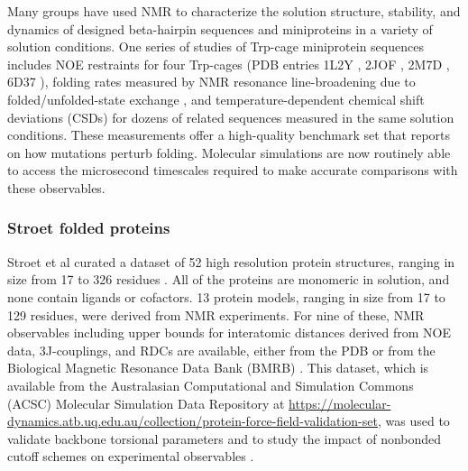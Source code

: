 \documentclass[9pt,review]{livecoms}
\begin{document}
Many groups have used NMR to characterize the solution structure, stability, and dynamics of designed beta-hairpin sequences \cite{blanco_short_1994,ramirez-alvarado_novo_1996,de_alba_turn_1997,maynard_origin_1998,stanger_rules_1998,cochran_tryptophan_2001,ramirez-alvarado_elongation_2001,pastor_combinatorial_2002,russell_stability_2003,skelton_hairpin_2003,fesinmeyer_enhanced_2004,espinosa_autonomously_2005,andersen_minimization_2006,honda_crystal_2008,kier_stabilizing_2010,scian_mutational_2013,jimenez_design_2014,anderson_nascent_2016,morales_design_2019,richaud_folding_2021,peintner_pushing_2022} and miniproteins \cite{struthers_design_1996,mcknight_nmr_1997,struthers_design_1998,imperiali_uniquely_1999,vermeulen_solution_2004,cornilescu_solution_2007,gronwald_evolutionary_2008} in a variety of solution conditions.
One series of studies of Trp-cage miniprotein sequences \cite{neidigh_designing_2002,lin_helical_2004,barua_trp-cage_2008,scian_crystal_2012,byrne_circular_2013,graham_reversing_2019} includes NOE restraints for four Trp-cages (PDB entries 1L2Y \cite{neidigh_designing_2002}, 2JOF \cite{barua_trp-cage_2008}, 2M7D \cite{byrne_circular_2013}, 6D37 \cite{graham_reversing_2019}), folding rates measured by NMR resonance line-broadening due to folded/unfolded-state exchange \cite{scian_mutational_2013,byrne_folding_2014}, and temperature-dependent chemical shift deviations (CSDs) for dozens of related sequences measured in the same solution conditions.
These measurements offer a high-quality benchmark set that reports on how mutations perturb folding.
Molecular simulations are now routinely able to access the microsecond timescales required to make accurate comparisons with these observables.

\subsubsection{Stroet folded proteins}
\label{sub2:stroet}

Stroet et al curated a dataset of 52 high resolution protein structures, ranging in size from 17 to 326 residues \cite{stroet_validation_2024}.
All of the proteins are monomeric in solution, and none contain ligands or cofactors.
13 protein models, ranging in size from 17 to 129 residues, were derived from NMR experiments.
For nine of these, NMR observables including upper bounds for interatomic distances derived from NOE data, 3J-couplings, and RDCs are available, either from the PDB or from the Biological Magnetic Resonance Data Bank (BMRB) \cite{ulrich_biomagresbank_2008,romero_biomagresbank_2020,hoch_biological_2023}. This dataset, which is available from the Australasian Computational and Simulation Commons (ACSC) Molecular Simulation Data Repository \cite{mark_australasian_2022} at \url{https://molecular-dynamics.atb.uq.edu.au/collection/protein-force-field-validation-set}, was used to validate backbone torsional parameters \cite{diem_hamiltonian_2020} and to study the impact of nonbonded cutoff schemes on experimental observables \cite{diem_effect_2020}.
\end{document}
